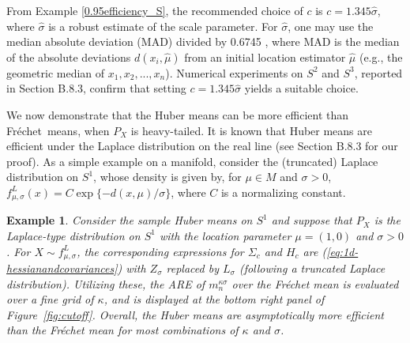 \documentclass[preprint]{imsart}
\def\Frechet{Fr\'{e}chet}
\theoremstyle{plain}
\newtheorem{example}{Example}
\theoremstyle{remark}
\begin{document}
From Example \ref{0.95efficiency_S},  
the recommended choice of $c$ is $c = 1.345\hat\sigma$, where $\hat\sigma$ is a robust estimate of the scale parameter. For $\hat\sigma$, one may use the median absolute deviation (MAD) divided by 0.6745 \citep{birch1980some}, 
where MAD is the median of the absolute deviations $d(x_{i}, \hat{\mu})$ from an initial location estimator $\hat\mu$ (e.g., the geometric median of $x_{1}, x_{2}, ..., x_{n}$). Numerical experiments on $S^2$ and $S^3$, reported in Section B.8.3, confirm that setting $c = 1.345 \hat{\sigma}$ yields a suitable choice.

We now demonstrate that the Huber means can be more efficient than \Frechet\ means, when $P_X$ is heavy-tailed. It is known that Huber means are efficient under the Laplace distribution on the real line (see Section B.8.3 for our proof). As a simple example on a manifold, consider the (truncated) Laplace distribution on $S^{1}$, whose density is given by, for $\mu \in M$ and $\sigma>0$, 
$f^{L}_{\mu, \sigma}(x) = C\exp\{-d(x, \mu)/\sigma\}$, 
where $C$ is a normalizing constant. 
  



\begin{example}\label{circle:laplace}
Consider the sample Huber means on $S^1$ and suppose that $P_X$ is the Laplace-type distribution on $S^1$ with the location parameter $\mu = (1,0)$ and $\sigma > 0$. For $X \sim f^{L}_{\mu, \sigma}$, 
the corresponding expressions for $\Sigma_c$ and $H_c$ are (\ref{eq:1d-hessianandcovariances}) with $Z_\sigma$ replaced by $L_\sigma$ (following a truncated Laplace distribution). Utilizing these, 
the ARE of $m^{\kappa \sigma}_{n}$ over the Fr\'{e}chet mean is evaluated over a fine grid of $\kappa$, and is displayed at the bottom right panel of Figure~\ref{fig:cutoff}. Overall, the Huber means are asymptotically more efficient than the Fr\'{e}chet mean for most combinations of $\kappa$ and $\sigma$.
\end{example}
\end{document}
